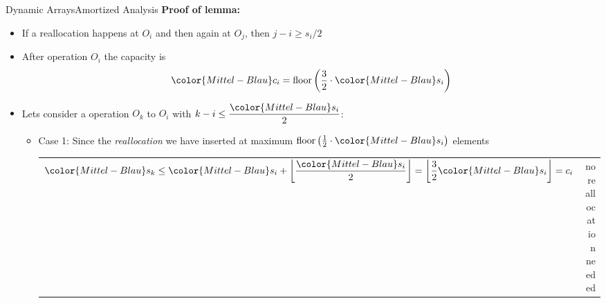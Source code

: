 \begin{frame}{Dynamic Arrays}{Amortized Analysis}
  \textbf{Proof of lemma:}
  \begin{itemize}
  \item
    If a reallocation happens at {\color{Mittel-Blau}$O_i$} and then again at {\color{Mittel-Blau}$O_j$}, then {\color{Mittel-Blau}$j - i\geq s_i/2$}
    \item
      After operation {\color{Mittel-Blau}$O_i$} the capacity is
      \[
        {\color{Mittel-Blau}c_i}
        = \mathrm{floor}\left(\frac{3}{2}\cdot{\color{Mittel-Blau}s_i}\right)
      \]
    \item
      Lets consider a operation {\color{Mittel-Blau}$O_k$} to {\color{Mittel-Blau}$O_i$} with
      $k -i \leq \dfrac{\color{Mittel-Blau}s_i}{2}$:
      \begin{itemize}
        \item
          Case 1: Since the \textit{reallocation} we have inserted at
          maximum
          $\mathrm{floor}\left(
            \frac{1}{2} \cdot {\color{Mittel-Blau}s_i}
          \right)$ elements
          \vspace{0.5em}\\
          \begin{tabularx}{\linewidth}{Xr}
            ${\color{Mittel-Blau}s_k}
              \leq {\color{Mittel-Blau}s_i} +
                \left\lfloor
                  \dfrac{\color{Mittel-Blau}s_i}{2}
                  \vphantom{\dfrac{3}{2}}
                \right\rfloor
              = \left\lfloor\dfrac{3}{2} {\color{Mittel-Blau}s_i}\right\rfloor
              = c_i$ &
              {\color{Mittel-Blau}no reallocation needed}
          \end{tabularx}
      \end{itemize}
  \end{itemize}
\end{frame}


